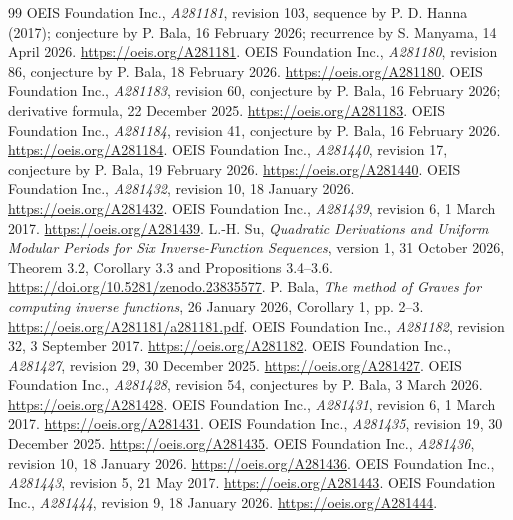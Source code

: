 \documentclass[11pt]{article}
\begin{document}
\begin{thebibliography}{99}
 OEIS Foundation Inc., \emph{A281181}, revision 103,
sequence by P. D. Hanna (2017); conjecture by P. Bala, 16 February 2026;
recurrence by S. Manyama, 14 April 2026.
\url{https://oeis.org/A281181}.
 OEIS Foundation Inc., \emph{A281180}, revision 86,
conjecture by P. Bala, 18 February 2026.
\url{https://oeis.org/A281180}.
 OEIS Foundation Inc., \emph{A281183}, revision 60,
conjecture by P. Bala, 16 February 2026; derivative formula,
22 December 2025. \url{https://oeis.org/A281183}.
 OEIS Foundation Inc., \emph{A281184}, revision 41,
conjecture by P. Bala, 16 February 2026.
\url{https://oeis.org/A281184}.
 OEIS Foundation Inc., \emph{A281440}, revision 17,
conjecture by P. Bala, 19 February 2026.
\url{https://oeis.org/A281440}.
 OEIS Foundation Inc., \emph{A281432}, revision 10,
18 January 2026. \url{https://oeis.org/A281432}.
 OEIS Foundation Inc., \emph{A281439}, revision 6,
1 March 2017. \url{https://oeis.org/A281439}.
 L.-H. Su, \emph{Quadratic Derivations and Uniform Modular
Periods for Six Inverse-Function Sequences}, version 1, 31 October 2026,
Theorem 3.2, Corollary 3.3 and Propositions 3.4--3.6.
\url{https://doi.org/10.5281/zenodo.23835577}.
 P. Bala, \emph{The method of Graves for computing inverse
functions}, 26 January 2026, Corollary 1, pp. 2--3.
\url{https://oeis.org/A281181/a281181.pdf}.
 OEIS Foundation Inc., \emph{A281182}, revision 32,
3 September 2017. \url{https://oeis.org/A281182}.
 OEIS Foundation Inc., \emph{A281427}, revision 29,
30 December 2025. \url{https://oeis.org/A281427}.
 OEIS Foundation Inc., \emph{A281428}, revision 54,
conjectures by P. Bala, 3 March 2026. \url{https://oeis.org/A281428}.
 OEIS Foundation Inc., \emph{A281431}, revision 6,
1 March 2017.
\url{https://oeis.org/A281431}.
 OEIS Foundation Inc., \emph{A281435}, revision 19,
30 December 2025. \url{https://oeis.org/A281435}.
 OEIS Foundation Inc., \emph{A281436}, revision 10,
18 January 2026. \url{https://oeis.org/A281436}.
 OEIS Foundation Inc., \emph{A281443}, revision 5,
21 May 2017. \url{https://oeis.org/A281443}.
 OEIS Foundation Inc., \emph{A281444}, revision 9,
18 January 2026. \url{https://oeis.org/A281444}.
\end{thebibliography}
\end{document}
